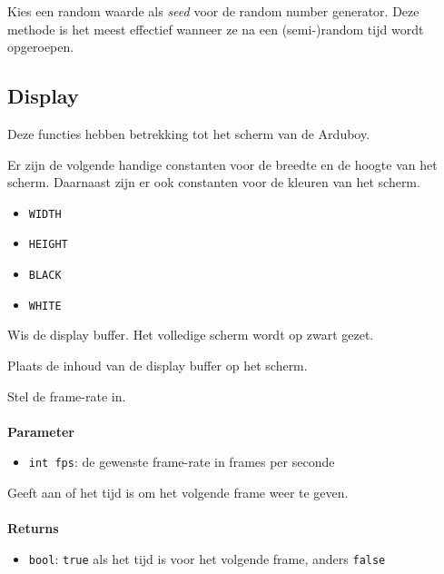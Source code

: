 \documentclass[11pt,fleqn]{book} %
\begin{document}
\begin{libf}[initRandomSeed()]
	Kies een random waarde als \emph{seed} voor de random number generator. Deze methode is het meest effectief wanneer ze na een (semi-)random tijd wordt opgeroepen.
\end{libf}

\subsection{Display}
Deze functies hebben betrekking tot het scherm van de Arduboy.

\begin{libf}
	Er zijn de volgende handige constanten voor de breedte en de hoogte van het scherm. Daarnaast zijn er ook constanten voor de kleuren van het scherm.
	\begin{multicols}{2}
		\begin{itemize}
			\item \texttt{WIDTH}
			\item \texttt{HEIGHT}
			\item \texttt{BLACK}
			\item \texttt{WHITE}
		\end{itemize}
	\end{multicols}
\end{libf}

\begin{libf}[clear()]
	Wis de display buffer. Het volledige scherm wordt op zwart gezet.
\end{libf}

\begin{libf}[display()]
	Plaats de inhoud van de display buffer op het scherm.
\end{libf}

\begin{libf}
	Stel de frame-rate in.\\ \\
	\textbf{Parameter}
	\begin{itemize}
		\item \texttt{int fps}: de gewenste frame-rate in frames per seconde
	\end{itemize}
\end{libf}

\begin{libf}[nextFrame()]
	Geeft aan of het tijd is om het volgende frame weer te geven.\\ \\
	\textbf{Returns}
	\begin{itemize}
		\item \texttt{bool}: \texttt{true} als het tijd is voor het volgende frame, anders \texttt{false}
	\end{itemize}
\end{libf}
\end{document}
